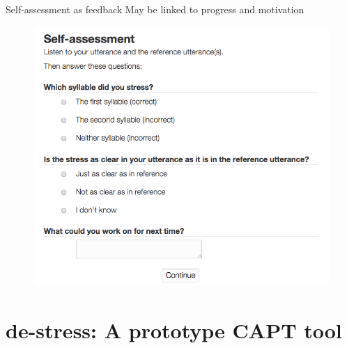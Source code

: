 \documentclass[xcolor={dvipsnames}]{beamer}
\newcommand{\TODO}[1]{{\color{red}\textbf{[TODO #1]}}}
\begin{document}
		\begin{frame}{Self-assessment as feedback}
		May be linked to progress and motivation
		
		\begin{figure}
		\includegraphics[height=0.7\textheight]{selfAssessment}
		\end{figure}
		\end{frame}

	
\section{de-stress: A prototype CAPT tool }

{ 
}

		
\end{document}
